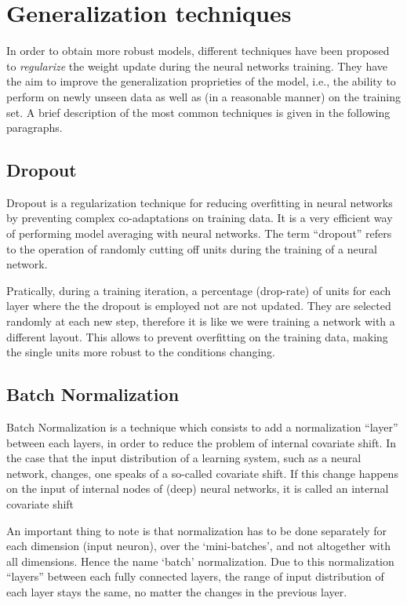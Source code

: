 \section{Generalization techniques}

In order to obtain more robust models, different techniques have been proposed to \textit{regularize} the weight update during the neural networks training. They have the aim to improve the generalization proprieties of the model, i.e., the ability to perform on newly unseen data as well as (in a reasonable manner) on the training set. A brief description of the most common techniques is given in the following paragraphs.

\subsection{Dropout}

Dropout is a regularization technique for reducing overfitting in neural networks by preventing complex co-adaptations on training data. It is a very efficient way of performing model averaging with neural networks. The term ``dropout'' refers to the operation of randomly cutting off units during the training of a neural network.

Pratically, during a training iteration, a percentage (drop-rate) of units for each layer where the the dropout is employed not are not updated. They are selected randomly at each new step, therefore it is like we were training a network with a different layout. This allows to prevent overfitting on the training data, making  the single units more robust to the conditions changing.
 
\subsection{Batch Normalization}
Batch Normalization is a technique which consists to add a normalization “layer” between each layers, in order to reduce the problem of internal covariate shift. In the case that the input distribution of a learning system, such as a neural network, changes, one speaks of a so-called covariate shift. If this change happens on the input of internal nodes of (deep) neural networks, it is called an internal covariate shift

An important thing to note is that normalization has to be done separately for each dimension (input neuron), over the ‘mini-batches’, and not altogether with all dimensions. Hence the name ‘batch’ normalization.
Due to this normalization “layers” between each fully connected layers, the range of input distribution of each layer stays the same, no matter the changes in the previous layer. 

